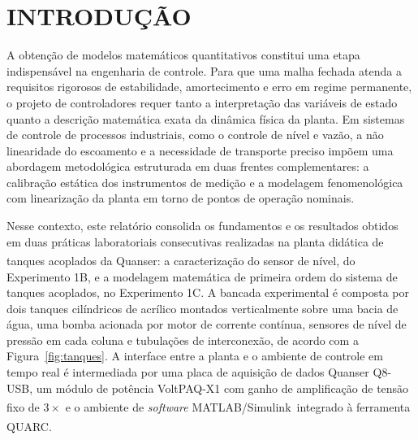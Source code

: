 \documentclass[a4paper,12pt]{article}
\begin{document}

\thispagestyle{empty}

\begin{center}
\listoffigures
\end{center}

\newpage


\thispagestyle{empty}

\begin{center}
\tableofcontents
\end{center}

\newpage


\thispagestyle{main}

\section{INTRODUÇÃO}

\begin{justify}
    \hspace{4ex}A obtenção de modelos matemáticos quantitativos constitui uma etapa indispensável na engenharia de controle. Para que uma malha fechada atenda a requisitos rigorosos de estabilidade, amortecimento e erro em regime permanente, o projeto de controladores requer tanto a interpretação das variáveis de estado quanto a descrição matemática exata da dinâmica física da planta. Em sistemas de controle de processos industriais, como o controle de nível e vazão, a não linearidade do escoamento e a necessidade de transporte preciso impõem uma abordagem metodológica estruturada em duas frentes complementares: a calibração estática dos instrumentos de medição e a modelagem fenomenológica com  linearização da planta em torno de pontos de operação nominais.
\end{justify}

\begin{justify}
    \hspace{4ex}Nesse contexto, este relatório consolida os fundamentos e os resultados obtidos em duas práticas laboratoriais consecutivas realizadas na planta didática de tanques acoplados da Quanser\textsuperscript{\textregistered}: a caracterização do sensor de nível, do Experimento 1B, e a modelagem matemática de primeira ordem do sistema de tanques acoplados, no Experimento 1C. A bancada experimental é composta por dois tanques cilíndricos de acrílico montados verticalmente sobre uma bacia de água, uma bomba acionada por motor de corrente contínua, sensores de nível de pressão em cada coluna e tubulações de interconexão, de acordo com a Figura~\ref{fig:tanques}. A interface entre a planta e o ambiente de controle em tempo real é intermediada por uma placa de aquisição de dados Quanser Q8-USB, um módulo de potência VoltPAQ-X1 com ganho de amplificação de tensão fixo de $3\times$ e o ambiente de \textit{software} MATLAB\textsuperscript{\textregistered}/Simulink\textsuperscript{\textregistered}\ integrado à ferramenta QUARC\textsuperscript{\textregistered}.
\end{justify}
\end{document}
